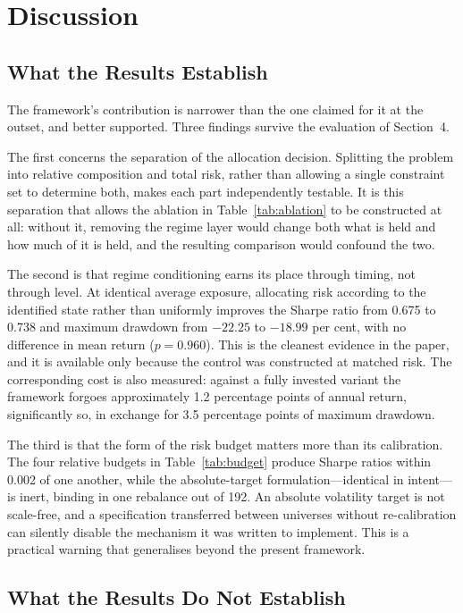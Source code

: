 \documentclass{singlecol-new}
\theoremstyle{TH}{
\newtheorem{lemma}{Lemma}
\newtheorem{theorem}[lemma]{Theorem}
\newtheorem{corrolary}[lemma]{Corrolary}
\newtheorem{conjecture}[lemma]{Conjecture}
\newtheorem{proposition}[lemma]{Proposition}
\newtheorem{claim}[lemma]{Claim}
\newtheorem{stheorem}[lemma]{Wrong Theorem}
\newtheorem{algorithm}{Algorithm}
}
\theoremstyle{THrm}{
\newtheorem{definition}{Definition}[section]
\newtheorem{question}{Question}[section]
\newtheorem{remark}{Remark}
\newtheorem{scheme}{Scheme}
}
\theoremstyle{THhit}{
\newtheorem{case}{Case}[section]
}
\begin{document}
\section{Discussion}
\label{sec:discussion}

\subsection{What the Results Establish}

The framework's contribution is narrower than the one claimed for it at the outset, and
better supported. Three findings survive the evaluation of Section~4.

The first concerns the separation of the allocation decision. Splitting the problem into
relative composition and total risk, rather than allowing a single constraint set to
determine both, makes each part independently testable. It is this separation that
allows the ablation in Table~\ref{tab:ablation} to be constructed at all: without it, removing the regime
layer would change both what is held and how much of it is held, and the resulting
comparison would confound the two.

The second is that regime conditioning earns its place through timing, not through
level. At identical average exposure, allocating risk according to the identified state
rather than uniformly improves the Sharpe ratio from 0.675 to 0.738 and maximum
drawdown from $-22.25$ to $-18.99$ per cent, with no difference in mean return
($p = 0.960$). This is the cleanest evidence in the paper, and it is available only
because the control was constructed at matched risk. The corresponding cost is also
measured: against a fully invested variant the framework forgoes approximately 1.2
percentage points of annual return, significantly so, in exchange for 3.5 percentage
points of maximum drawdown.

The third is that the form of the risk budget matters more than its calibration. The
four relative budgets in Table~\ref{tab:budget} produce Sharpe ratios within 0.002 of one another,
while the absolute-target formulation---identical in intent---is inert, binding in one
rebalance out of 192. An absolute volatility target is not scale-free, and a
specification transferred between universes without re-calibration can silently disable
the mechanism it was written to implement. This is a practical warning that generalises
beyond the present framework.

\subsection{What the Results Do Not Establish}
\end{document}
